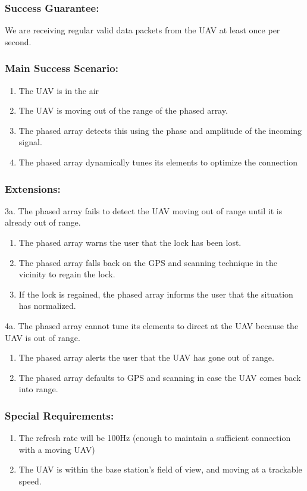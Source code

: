 \documentclass[ProductRequirements.tex]{subfiles}
\begin{document}
	\subsubsection*{Success Guarantee:}
	We are receiving regular valid data packets from the UAV at least once per second. 
	\subsubsection*{Main Success Scenario:}
	\begin{enumerate}\itemsep1pt
		\item The UAV is in the air
		\item The UAV is moving out of the range of the phased array.
		\item The phased array detects this using the phase and amplitude of the incoming signal.
		\item The phased array dynamically tunes its elements to optimize the connection 
	\end{enumerate}
	\subsubsection*{Extensions:}
	3a. The phased array fails to detect the UAV moving out of range until it is already out of range.
	\begin{enumerate}
		\item The phased array warns the user that the lock has been lost.
		\item The phased array falls back on the GPS and scanning technique in the vicinity to regain the lock.
		\item If the lock is regained, the phased array informs the user that the situation has normalized.
	\end{enumerate}
	4a. The phased array cannot tune its elements to direct at the UAV because the UAV is out of range.
	\begin{enumerate}
		\item The phased array alerts the user that the UAV has gone out of range.
		\item The phased array defaults to GPS and scanning in case the UAV comes back into range.
	\end{enumerate}
	\subsubsection*{Special Requirements:}
	\begin{enumerate}\itemsep1pt
		\item The refresh rate will be 100Hz (enough to maintain a sufficient connection with a moving UAV)
		\item The UAV is within the base station's field of view, and moving at a trackable speed. 
	\end{enumerate}
\end{document}
